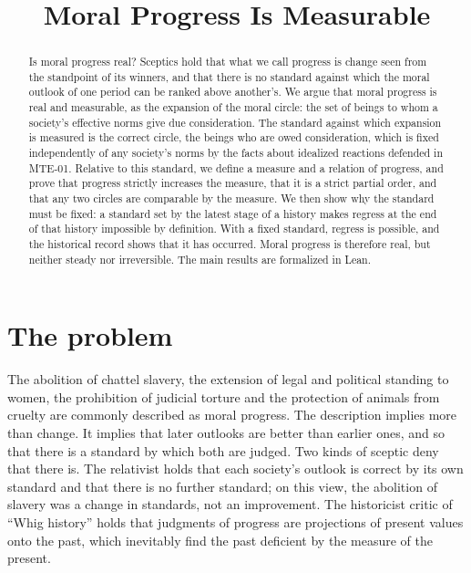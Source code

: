 \documentclass{situationist-preprint}
\title{Moral Progress Is Measurable}
\begin{document}
\maketitle

\begin{abstract}
Is moral progress real? Sceptics hold that what we call progress is change seen from the standpoint of its winners, and that there is no standard against which the moral outlook of one period can be ranked above another's. We argue that moral progress is real and measurable, as the expansion of the moral circle: the set of beings to whom a society's effective norms give due consideration. The standard against which expansion is measured is the correct circle, the beings who are owed consideration, which is fixed independently of any society's norms by the facts about idealized reactions defended in MTE-01. Relative to this standard, we define a measure and a relation of progress, and prove that progress strictly increases the measure, that it is a strict partial order, and that any two circles are comparable by the measure. We then show why the standard must be fixed: a standard set by the latest stage of a history makes regress at the end of that history impossible by definition. With a fixed standard, regress is possible, and the historical record shows that it has occurred. Moral progress is therefore real, but neither steady nor irreversible. The main results are formalized in Lean.
\end{abstract}

\section{The problem}

The abolition of chattel slavery, the extension of legal and political standing to women, the prohibition of judicial torture and the protection of animals from cruelty are commonly described as moral progress. The description implies more than change. It implies that later outlooks are better than earlier ones, and so that there is a standard by which both are judged. Two kinds of sceptic deny that there is. The relativist holds that each society's outlook is correct by its own standard and that there is no further standard; on this view, the abolition of slavery was a change in standards, not an improvement. The historicist critic of \enquote{Whig history} holds that judgments of progress are projections of present values onto the past, which inevitably find the past deficient by the measure of the present.
\end{document}
